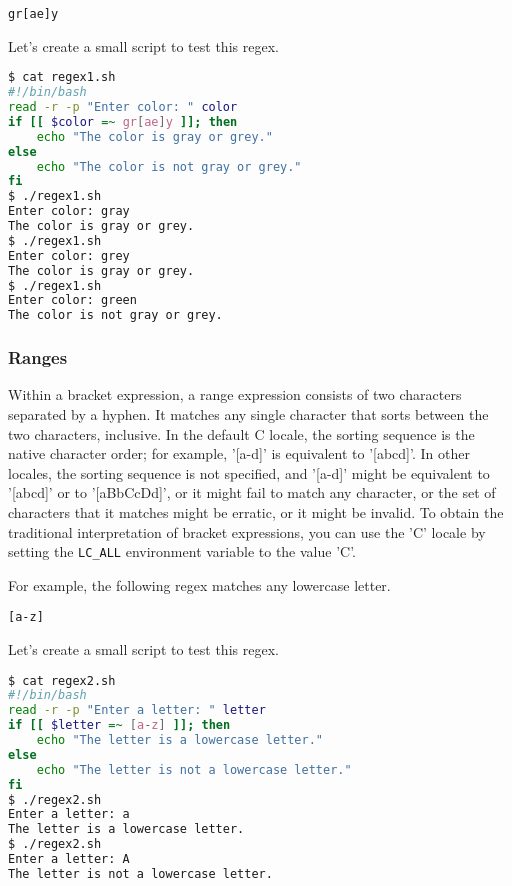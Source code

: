 \lstinline|gr[ae]y|

Let's create a small script to test this regex.

\begin{lstlisting}[language=bash]
$ cat regex1.sh
#!/bin/bash
read -r -p "Enter color: " color
if [[ $color =~ gr[ae]y ]]; then
    echo "The color is gray or grey."
else
    echo "The color is not gray or grey."
fi
$ ./regex1.sh
Enter color: gray
The color is gray or grey.
$ ./regex1.sh
Enter color: grey
The color is gray or grey.
$ ./regex1.sh
Enter color: green
The color is not gray or grey.
\end{lstlisting}

\subsubsection{Ranges}

Within a bracket expression, a range expression consists of two characters separated by a hyphen. It matches any single character that sorts between the two characters, inclusive. In the default C locale, the sorting sequence is the native character order; for example, '[a-d]' is equivalent to '[abcd]'.
In other locales, the sorting sequence is not specified, and '[a-d]' might be equivalent to '[abcd]' or to '[aBbCcDd]', or it might fail to match any character, or the set of characters that it matches might be erratic, or it might be invalid. To obtain the traditional interpretation of bracket expressions, you can use the 'C' locale by setting the \lstinline|LC_ALL| environment variable to the value 'C'.

For example, the following regex matches any lowercase letter.

\lstinline|[a-z]|

Let's create a small script to test this regex.

\begin{lstlisting}[language=bash]
$ cat regex2.sh
#!/bin/bash
read -r -p "Enter a letter: " letter
if [[ $letter =~ [a-z] ]]; then
    echo "The letter is a lowercase letter."
else
    echo "The letter is not a lowercase letter."
fi
$ ./regex2.sh
Enter a letter: a
The letter is a lowercase letter.
$ ./regex2.sh
Enter a letter: A
The letter is not a lowercase letter.
\end{lstlisting}

